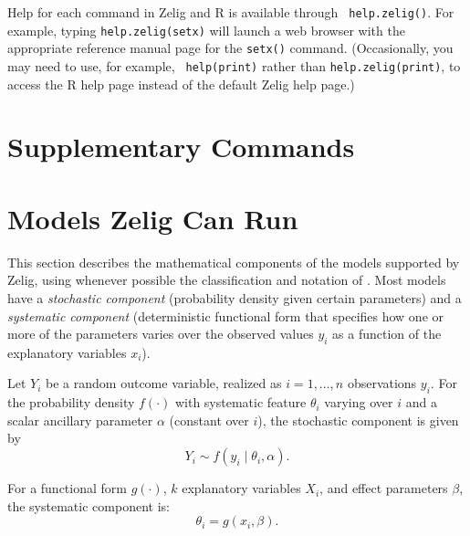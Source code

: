 \documentclass{article}
\begin{document}
\label{s:main}

Help for each command in Zelig and R is available through {\tt
  help.zelig()}.  For example, typing {\tt help.zelig(setx)} will
launch a web browser with the appropriate reference manual page for
the {\tt setx()} command.  (Occasionally, you may need to use, for example, {\tt
  help(print)} rather than {\tt help.zelig(print)}, to access the R
  help page instead of the default Zelig help page.)  









\chapter{Supplementary Commands}










\chapter{Models Zelig Can Run}\label{s:model.details}

This section describes the mathematical components of the models
supported by Zelig, using whenever possible the classification and
notation of \cite{King89}.  Most models have a \emph{stochastic
  component} (probability density given certain parameters) and
a \emph{systematic component} (deterministic functional form that
specifies how one or more of the parameters varies over the observed
values $y_i$ as a function of the explanatory variables $x_i$).

Let $Y_i$ be a random outcome variable, realized as $i = 1, \dots, n$
observations $y_i$.  For the probability density $f(\cdot)$ with
systematic feature $\theta_i$ varying over $i$ and a scalar ancillary
parameter $\alpha$ (constant over $i$), the stochastic component is
given by
\begin{equation*}
Y_i \sim f(y_i \mid \theta_i, \alpha).
\end{equation*}

For a functional form $g(\cdot)$, $k$ explanatory variables $X_i$, and
effect parameters $\beta$, the systematic component is:  
\begin{equation*}
\theta_i = g(x_i, \beta).
\end{equation*}
\end{document}
